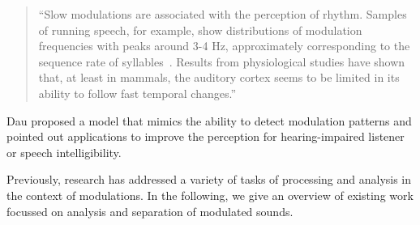 \begin{quote}
``Slow modulations are associated with the perception of rhythm. Samples of running speech, for example, show distributions of modulation frequencies with peaks around 3-4 Hz, approximately corresponding to the sequence rate of syllables~\cite{plomp83}. Results from physiological studies have shown that, at least in mammals, the auditory cortex seems to be limited in its ability to follow fast temporal changes.''
\end{quote}

Dau proposed a model that mimics the ability to detect modulation patterns and pointed out applications to improve the perception for hearing-impaired listener or speech intelligibility.
\par
Previously, research has addressed a variety of tasks of processing and analysis in the context of modulations.
In the following, we give an overview of existing work focussed on analysis and separation of modulated sounds.

